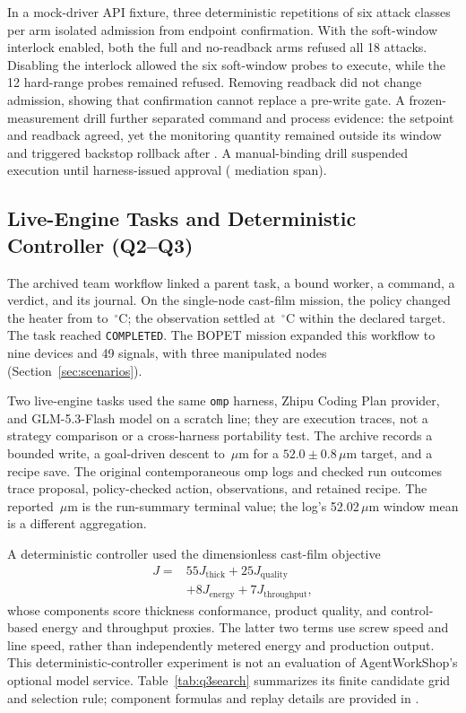 In a mock-driver API fixture, three deterministic repetitions of six attack
classes per arm isolated admission from endpoint confirmation. With the
soft-window interlock enabled, both the full and no-readback arms refused
all 18 attacks. Disabling the interlock allowed the six soft-window probes
to execute, while the 12 hard-range probes remained refused. Removing
readback did not change admission, showing that confirmation cannot replace
a pre-write gate. A frozen-measurement drill further separated command and
process evidence: the setpoint and readback agreed, yet the monitoring
quantity remained outside its window and triggered backstop rollback after
\resBackstop{}. A manual-binding drill suspended execution until
harness-issued approval (\resHitlLatency{} mediation span).

\subsection{Live-Engine Tasks and Deterministic Controller (Q2--Q3)}
\label{sec:agentteam}
The archived team workflow linked a parent task, a bound worker, a command,
a verdict, and its journal. On the single-node cast-film mission, the policy
changed the heater from \resMissionFrom{} to
\resMissionTo\,$^{\circ}$C; the observation settled at
\resMissionPv\,$^{\circ}$C within the declared target. The task reached
\texttt{COMPLETED}. The BOPET mission expanded this workflow to nine devices
and 49 signals, with three manipulated nodes
(Section~\ref{sec:scenarios}).

Two live-engine tasks used the same \texttt{omp} harness, Zhipu Coding Plan
provider, and GLM-5.3-Flash model on a scratch line; they are execution
traces, not a strategy comparison or a cross-harness portability test. The archive
records a bounded write, a goal-driven
descent to \resGoalFinal\,$\mu$m for a $52.0\pm0.8$\,$\mu$m target, and a
recipe save. The original contemporaneous omp logs and checked run outcomes
trace proposal, policy-checked action, observations, and retained recipe.
The reported \resGoalFinal\,$\mu$m is the run-summary terminal value;
the log's 52.02\,$\mu$m window mean is a different aggregation.

\label{sec:controller}
A deterministic controller used the dimensionless cast-film objective
\begin{equation}
\begin{aligned}
J={}&55J_{\mathrm{thick}}+25J_{\mathrm{quality}}\\
&+8J_{\mathrm{energy}}+7J_{\mathrm{throughput}},
\end{aligned}
\label{eq:objective}
\end{equation}
whose components score thickness conformance, product quality, and
control-based energy and throughput proxies. The latter two terms use
screw speed and line speed, rather than independently metered energy and
production output. This deterministic-controller experiment is not an
evaluation of AgentWorkShop's optional model service. Table~\ref{tab:q3search}
summarizes its finite candidate grid and selection rule; component formulas
and replay details are provided in .

